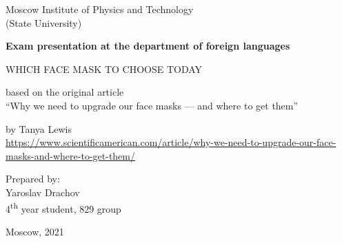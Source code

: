 \begin{titlepage}
   \begin{center}
	   Moscow Institute of Physics and Technology\\
	   (State University)
       \vspace*{3cm}

       \textbf{Exam presentation at the
       department of foreign languages}

       \vspace{0.5cm}

       WHICH FACE MASK TO CHOOSE TODAY
        
       \vspace{0.5cm}
        
        based on the original article\\
	``Why we need to upgrade our face masks --- and where to get them''
            
       \vspace{0.5cm}

       by Tanya Lewis\\
       \url{https://www.scientificamerican.com/article/why-we-need-to-upgrade-our-face-masks-and-where-to-get-them/}

       \vfill
            
     
       \begin{flushright}
       Prepared by:\\
       Yaroslav Drachov\\
       4\textsuperscript{th} year student, 829 group
       \end{flushright} 
       
       \vspace{3cm}
        
       Moscow, 2021
   \end{center}
\end{titlepage}
